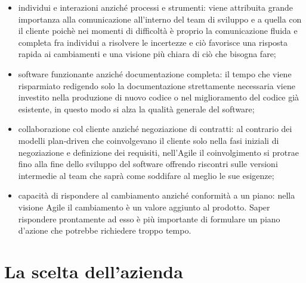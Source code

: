 \documentclass[target=bach,aauheader=,style=]{thud}
\begin{document}
\begin{itemize}
    \item individui e interazioni anziché processi e strumenti: viene attribuita grande importanza alla comunicazione all'interno del
    team di sviluppo e a quella con il cliente poichè nei momenti di difficoltà è proprio la comunicazione fluida e completa fra individui
    a risolvere le incertezze e ciò favorisce una risposta rapida ai cambiamenti e una visione più chiara di ciò che bisogna fare;
    \item software funzionante anziché documentazione completa: il tempo che viene risparmiato redigendo solo la documentazione strettamente
    necessaria viene investito nella produzione di nuovo codice o nel miglioramento del codice già esistente, in questo modo si alza
    la qualità generale del software;
    \item collaborazione col cliente anziché negoziazione di contratti: al contrario dei modelli plan-driven che coinvolgevano il cliente
    solo nella fasi iniziali di negoziazione e definizione dei requisiti, nell'Agile il coinvolgimento si protrae fino alla fine dello sviluppo
    del software offrendo riscontri sulle versioni intermedie al team che saprà come soddifare al meglio le sue esigenze;
    \item capacità di rispondere al cambiamento anziché conformità a un piano: nella visione Agile il cambiamento è un valore aggiunto al
    prodotto. Saper rispondere prontamente ad esso è più importante di formulare un piano d'azione che potrebbe richiedere troppo tempo.
\end{itemize}

\section{La scelta dell'azienda}
\end{document}
